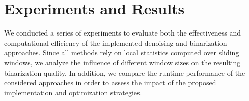 \section{Experiments and Results}\label{sec:experiments_results}

We conducted a series of experiments to evaluate both the effectiveness and computational efficiency of the implemented denoising and binarization approaches.
Since all methods rely on local statistics computed over sliding windows, we analyze the influence of different window sizes on the resulting binarization quality.
In addition, we compare the runtime performance of the considered approaches in order to assess the impact of the proposed implementation and optimization strategies.
